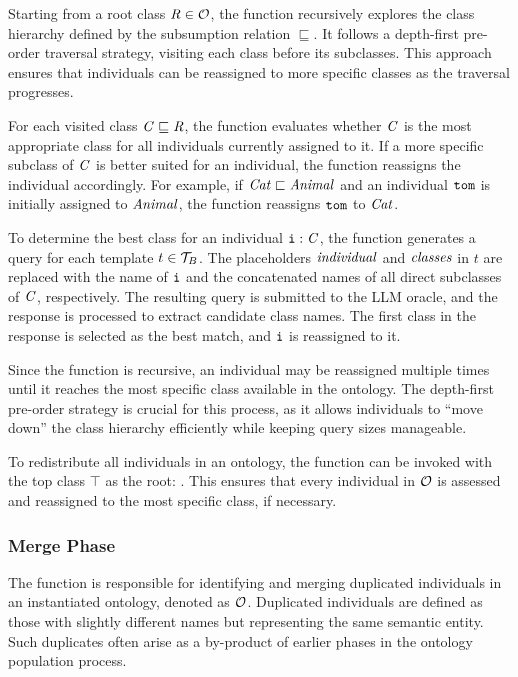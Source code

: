 %
Starting from a root class \(\concept{R} \in \relset{O}\), the function recursively explores the class hierarchy defined by the subsumption relation \(\sqsubseteq\).
%
It follows a depth-first pre-order traversal strategy, visiting each class before its subclasses.
%
This approach ensures that individuals can be reassigned to more specific classes as the traversal progresses.

%
For each visited class \(\concept{C} \sqsubseteq \concept{R}\), the function evaluates whether \(\concept{C}\) is the most appropriate class for all individuals currently assigned to it.
%
If a more specific subclass of \(\concept{C}\) is better suited for an individual, the function reassigns the individual accordingly.
%
For example, if \(\concept{Cat} \sqsubset \concept{Animal}\) and an individual \(\instance{tom}\) is initially assigned to \(\concept{Animal}\), the function reassigns \(\instance{tom}\) to \(\concept{Cat}\).

%
To determine the best class for an individual \(\instance{i} : \concept{C}\), the function generates a query for each template \(t \in \relset{T}_{B}\).
%
The placeholders \(\mathit{individual}\) and \(\mathit{classes}\) in \(t\) are replaced with the name of \(\instance{i}\) and the concatenated names of all direct subclasses of \(\concept{C}\), respectively.
%
The resulting query is submitted to the \gls{LLM} oracle, and the response is processed to extract candidate class names.
%
The first class in the response is selected as the best match, and \(\instance{i}\) is reassigned to it.

%
Since the function is recursive, an individual may be reassigned multiple times until it reaches the most specific class available in the ontology.
%
The depth-first pre-order strategy is crucial for this process, as it allows individuals to ``move down'' the class hierarchy efficiently while keeping query sizes manageable.

%
To redistribute all individuals in an ontology, the function can be invoked with the top class \(\top\) as the root:
%
.
%
This ensures that every individual in \(\relset{O}\) is assessed and reassigned to the most specific class, if necessary.


\subsubsection{Merge Phase}
\label{subsubsec:merge-phase}
%

%
The \merge{} function is responsible for identifying and merging duplicated individuals in an instantiated ontology, denoted as $\relset{O}$.
%
Duplicated individuals are defined as those with slightly different names but representing the same semantic entity.
%
Such duplicates often arise as a by-product of earlier phases in the ontology population process.


